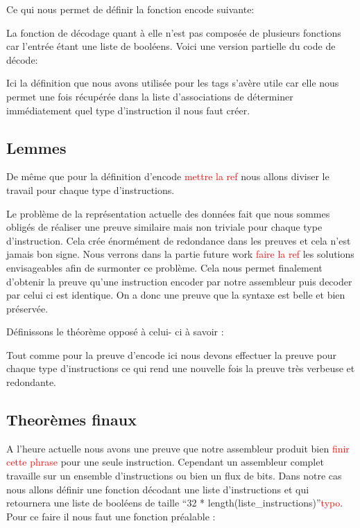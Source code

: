 \documentclass {article}
\newcommand{\codefrom}[3]
           {}
\theoremstyle{definition}
\theoremstyle{remark}
\newcommand{\todo}[1]{\textcolor{red}{#1}}
\begin{document}
Ce qui nous permet de définir la fonction encode suivante:

\codefrom{src}{encode}{encode}

La fonction de décodage quant à elle n'est pas composée de plusieurs fonctions car l'entrée
étant une liste de booléens.
Voici une version partielle du code de décode:

\codefrom{src}{encode}{decode}

Ici la définition que nous avons utilisée pour les tags s'avère utile car elle nous permet
une fois récupérée dans la liste d'associations de déterminer immédiatement quel type
d'instruction il nous faut créer.





\subsection{Lemmes}
\label{LemmesEncode}
De même que pour la définition d'encode \todo{mettre la ref} nous allons diviser le travail pour chaque
type d'instructions.

\codefrom{src}{encodeProof}{encode_decode_t_n}

Le problème de la représentation actuelle des données fait que nous sommes obligés de réaliser une preuve
similaire mais non triviale pour chaque type d'instruction. Cela crée énormément de redondance dans les preuves
et cela n'est jamais bon signe. Nous verrons dans la partie future work \todo{faire la ref} les solutions envisageables afin
de surmonter ce problème.
Cela nous permet finalement d'obtenir la preuve qu'une instruction encoder par notre assembleur puis decoder par celui
ci est identique. On a donc une preuve que la syntaxe est belle et bien préservée.

Définissons le théorème opposé à celui- ci à savoir :

\codefrom{src}{encodeProof}{decode_encode}

Tout comme pour la preuve d'encode ici nous devons effectuer la preuve pour chaque type d'instructions
ce qui rend une nouvelle fois la preuve très verbeuse et redondante. 




\subsection{Theorèmes finaux}

A l'heure actuelle nous avons une preuve que notre assembleur produit bien \todo{finir cette phrase}
pour une seule instruction. Cependant un assembleur complet travaille sur un ensemble d'instructions
ou bien un flux de bits. Dans notre cas nous allons définir une fonction décodant une liste d'instructions et qui
retournera une liste de booléens de taille ``32 * length(liste\_instructions)''\todo{typo}.
Pour ce faire il nous faut une fonction préalable :
\end{document}
